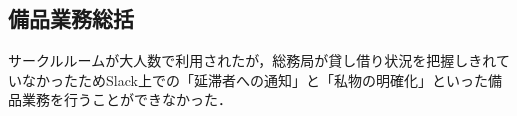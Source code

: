 \subsection*{備品業務総括}

サークルルームが大人数で利用されたが，総務局が貸し借り状況を把握しきれていなかったためSlack上での「延滞者への通知」と「私物の明確化」といった備品業務を行うことができなかった．

